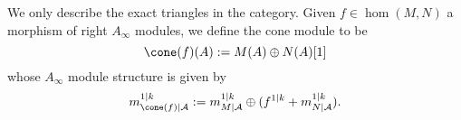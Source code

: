 
 
 
We only describe the exact triangles in the category. Given $f\in \hom(M, N)$ a morphism of right $A_\infty$ modules, we define the cone module to be 
\[\cone(f)(A):=M(A)\oplus N(A)[1]\]
whose $A_\infty$ module structure is given by 
\[ m^{1|k}_{\cone(f)|\mathcal A}:=m^{1|k}_{M|\mathcal A}\oplus (f^{1|k}+ m^{1|k}_{N|\mathcal A}).\]

 
